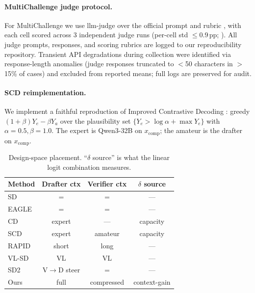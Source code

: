 \documentclass[11pt]{article}
\theoremstyle{plain}
\theoremstyle{definition}
\begin{document}
\paragraph{MultiChallenge judge protocol.}
For MultiChallenge we use llm-judge over the official prompt and rubric \citep{sirdeshmukh2025multichallenge}, with each cell scored across 3 independent judge runs (per-cell std $\le0.9$\,pp; ). All judge prompts, responses, and scoring rubrics are logged to our reproducibility repository. Transient API degradations during collection were identified via response-length anomalies (judge responses truncated to $<$50 characters in $>$15\% of cases) and excluded from reported means; full logs are preserved for audit.

\paragraph{SCD reimplementation.}
We implement a faithful reproduction of Improved Contrastive Decoding \citep{yuan2023scd,obrien2023cdreasoning}: greedy $(1{+}\beta)Y_e-\beta Y_a$ over the plausibility set $\{Y_e>\log\alpha+\max Y_e\}$ with $\alpha{=}0.5, \beta{=}1.0$. The expert is Qwen3-32B on $x_{\text{comp}}$; the amateur is the drafter on $x_{\text{comp}}$.


\begin{table}[t]
\centering
\footnotesize
\setlength{\tabcolsep}{6pt}
\begin{tabular}{lccc}
\toprule
Method & Drafter ctx & Verifier ctx & $\delta$ source \\
\midrule
SD \citep{leviathan2023fast} & = & = & --- \\
EAGLE \citep{li2024eagle} & = & = & --- \\
CD \citep{li2023contrastive} & expert & --- & capacity \\
SCD \citep{yuan2023scd} & expert & amateur & capacity \\
RAPID \citep{liu2025rapid} & short & long & --- \\
VL-SD \citep{specvlm2025,specllava2025,vispec2025} & VL & VL & --- \\
SD2 \citep{sd2_2025} & V$\to$D steer & = & --- \\
\midrule
Ours & full & compressed & context-gain \\
\bottomrule
\end{tabular}
\caption{Design-space placement. ``$\delta$ source'' is what the linear logit combination measures.}
\label{tab:distinguish}
\end{table}
\end{document}
